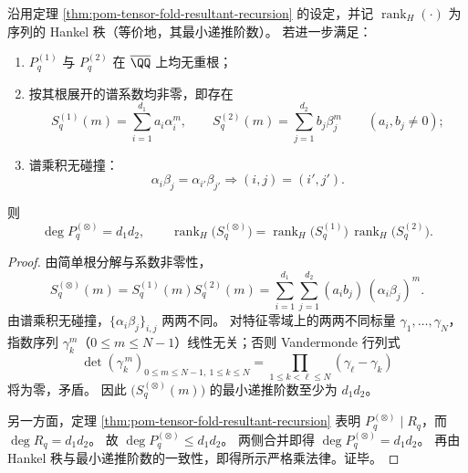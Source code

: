 \begin{corollary}\label{cor:pom-tensor-fold-hankel-rank-multiplicativity}
沿用定理 \ref{thm:pom-tensor-fold-resultant-recursion} 的设定，并记
\(
\operatorname{rank}_H(\cdot)
\)
为序列的 Hankel 秩（等价地，其最小递推阶数）。
若进一步满足：
\begin{enumerate}
  \item \(P_q^{(1)}\) 与 \(P_q^{(2)}\) 在 \(\overline{\QQ}\) 上均无重根；
  \item 按其根展开的谱系数均非零，即存在
  \[
  S_q^{(1)}(m)=\sum_{i=1}^{d_1}a_i\alpha_i^m,
  \qquad
  S_q^{(2)}(m)=\sum_{j=1}^{d_2}b_j\beta_j^m
  \qquad(a_i,b_j\neq 0) ;
  \]
  \item 谱乘积无碰撞：
  \[
  \alpha_i\beta_j=\alpha_{i'}\beta_{j'}
  \Longrightarrow
  (i,j)=(i',j').
  \]
\end{enumerate}
则
\[
\deg P_q^{(\otimes)}=d_1d_2,
\qquad
\operatorname{rank}_H\!\bigl(S_q^{(\otimes)}\bigr)
=\operatorname{rank}_H\!\bigl(S_q^{(1)}\bigr)\,
\operatorname{rank}_H\!\bigl(S_q^{(2)}\bigr).
\]
\end{corollary}
\begin{proof}
由简单根分解与系数非零性，
\[
S_q^{(\otimes)}(m)
=S_q^{(1)}(m)S_q^{(2)}(m)
=\sum_{i=1}^{d_1}\sum_{j=1}^{d_2}(a_ib_j)\,(\alpha_i\beta_j)^m.
\]
由谱乘积无碰撞，\(\{\alpha_i\beta_j\}_{i,j}\) 两两不同。
对特征零域上的两两不同标量 \(\gamma_1,\dots,\gamma_N\)，指数序列 \(\gamma_k^m\)（\(0\le m\le N-1\)）线性无关；否则 Vandermonde 行列式
\[
\det(\gamma_k^{\,m})_{0\le m\le N-1,\ 1\le k\le N}
=\prod_{1\le k<\ell\le N}(\gamma_\ell-\gamma_k)
\]
将为零，矛盾。
因此 \(\bigl(S_q^{(\otimes)}(m)\bigr)\) 的最小递推阶数至少为 \(d_1d_2\)。

另一方面，定理 \ref{thm:pom-tensor-fold-resultant-recursion} 表明
\(
P_q^{(\otimes)}\mid R_q
\)，而 \(\deg R_q=d_1d_2\)。
故 \(\deg P_q^{(\otimes)}\le d_1d_2\)。
两侧合并即得 \(\deg P_q^{(\otimes)}=d_1d_2\)。
再由 Hankel 秩与最小递推阶数的一致性，即得所示严格乘法律。证毕。
\end{proof}

